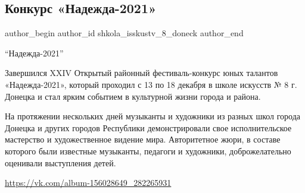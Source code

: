 
 
 
 
 
\subsection{Конкурс «Надежда-2021»}
\label{sec:20_12_2021.vk.shkola_isskustv_8_doneck.1.konkurs_nadezhda}

\ifcmt
 author_begin
   author_id shkola_isskustv_8_doneck
 author_end
\fi

\enquote{Надежда-2021}

Завершился XXIV Открытый районный фестиваль-конкурс юных талантов
«Надежда-2021», который проходил с 13 по 18 декабря в школе искусств № 8 г.
Донецка и стал ярким событием в культурной жизни города и района. 


На протяжении нескольких дней музыканты и художники из разных школ города
Донецка и других городов Республики демонстрировали свое исполнительское
мастерство и художественное видение мира. Авторитетное жюри, в составе которого
были известные музыканты, педагоги и художники, доброжелательно оценивали
выступления детей.

\url{https://vk.com/album-156028649_282265931}

